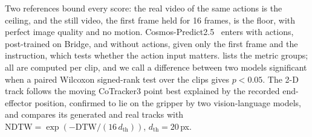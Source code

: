 Two references bound every score: the real video of the same actions is the ceiling, and the still video, the first frame held for 16 frames, is the floor, with perfect image quality and no motion.
Cosmos-Predict2.5~\cite{nvidia2025cosmos} enters with actions, post-trained on Bridge, and without actions, given only the first frame and the instruction, which tests whether the action input matters.
 lists the metric groups; all are computed per clip, and we call a difference between two models significant when a paired Wilcoxon signed-rank test over the clips gives $p<0.05$.
The 2-D track follows the moving CoTracker3 point best explained by the recorded end-effector position, confirmed to lie on the gripper by two vision-language models, and compares its generated and real tracks with $\mathrm{NDTW}=\exp(-\mathrm{DTW}/(16\,d_{\mathrm{th}}))$, $d_{\mathrm{th}}=20$\,px.
